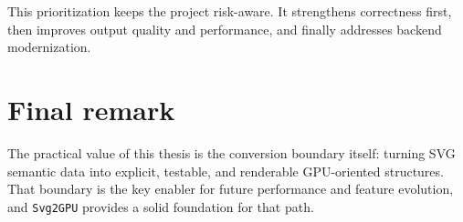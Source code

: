 This prioritization keeps the project risk-aware.
It strengthens correctness first, then improves output quality and performance, and finally addresses backend modernization.

\section{Final remark}

The practical value of this thesis is the conversion boundary itself: turning SVG semantic data into explicit, testable, and renderable GPU-oriented structures.
That boundary is the key enabler for future performance and feature evolution, and \texttt{Svg2GPU} provides a solid foundation for that path.
